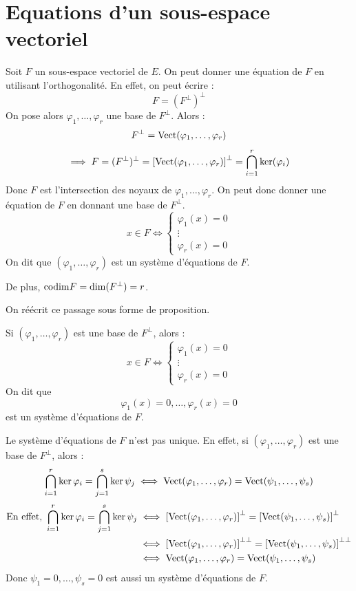 \documentclass[11pt,a4paper]{report}
\begin{document}
\section{Equations d'un sous-espace vectoriel}

Soit $F$ un sous-espace vectoriel de $E$. On peut donner une équation de $F$ en utilisant l'orthogonalité. En effet, on peut écrire :
$$F = (F^\perp)^\perp$$
On pose alors $\varphi_1, \dots, \varphi_r$ une base de $F^\perp$. Alors :
$$F^\perp = \mathrm{Vect}(\varphi_1, \dots, \varphi_r)$$
$$\implies F = (F^\perp)^\perp = \left[\mathrm{Vect}(\varphi_1, \dots, \varphi_r)\right]^\perp = \bigcap_{i=1}^r \ker(\varphi_i)$$
Donc $F$ est l'intersection des noyaux de $\varphi_1, \dots, \varphi_r$. On peut donc donner une équation de $F$ en donnant une base de $F^\perp$.
$$x \in F \iff \begin{cases} 
\varphi_1(x) = 0 \\
\vdots \\
\varphi_r(x) = 0
\end{cases}$$
On dit que $(\varphi_1, \dots, \varphi_r)$ est un système d'équations de $F$.

De plus, $\mathrm{codim} F = \dim(F^\perp) = r$.

On réécrit ce passage sous forme de proposition.

\begin{proposition}
    Si $(\varphi_1,\dots,\varphi_r)$ est une base de $F^\perp$, alors :
    $$x \in F \iff \begin{cases}
    \varphi_1(x) = 0 \\
    \vdots \\
    \varphi_r(x) = 0
    \end{cases}$$
    On dit que $$\varphi_1(x) = 0, \dots, \varphi_r(x) = 0$$ est un système d'équations de $F$.
\end{proposition}

\begin{remark}
    Le système d'équations de $F$ n'est pas unique. En effet, si $(\varphi_1, \dots, \varphi_r)$ est une base de $F^\perp$, alors :
    $$\bigcap_{i=1}^r \ker\varphi_i = \bigcap_{j=1}^s \ker\psi_j
    \iff \mathrm{Vect}(\varphi_1, \dots, \varphi_r) = \mathrm{Vect}(\psi_1, \dots, \psi_s)$$
    \begin{align*}
        \text{En effet, } \bigcap_{i=1}^r \ker\varphi_i = \bigcap_{j=1}^s \ker\psi_j &\iff \left[\mathrm{Vect}(\varphi_1, \dots, \varphi_r)\right]^\perp = \left[\mathrm{Vect}(\psi_1, \dots, \psi_s)\right]^\perp \\
        &\iff \left[\mathrm{Vect}(\varphi_1, \dots, \varphi_r)\right]^{\perp\perp} = \left[\mathrm{Vect}(\psi_1, \dots, \psi_s)\right]^{\perp\perp} \\
        &\iff \mathrm{Vect}(\varphi_1, \dots, \varphi_r) = \mathrm{Vect}(\psi_1, \dots, \psi_s)
    \end{align*}
    Donc $\psi_1 = 0, \dots, \psi_s = 0$ est aussi un système d'équations de $F$.
\end{remark}
\todo
\end{document}
